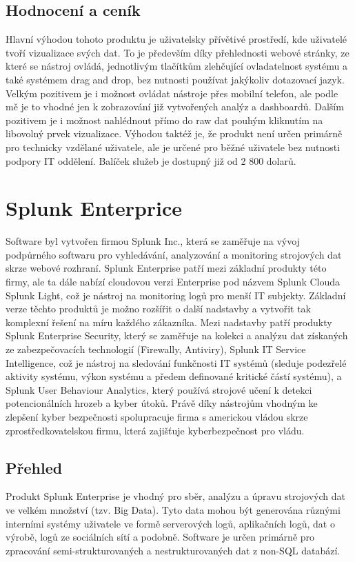 \documentclass[czech,BP]{thesiskiv2}
\begin{document}
\subsection{Hodnocení a ceník}
Hlavní výhodou tohoto produktu je uživatelsky přívětivé prostředí, kde uživatelé tvoří vizualizace svých dat. To je především díky přehlednosti webové stránky, ze které se nástroj ovládá, jednotlivým tlačítkům zlehčující ovladatelnost systému a také systémem drag and drop, bez nutnosti používat jakýkoliv dotazovací jazyk. Velkým pozitivem je i možnost ovládat nástroje přes mobilní telefon, ale podle mě je to vhodné jen k zobrazování již vytvořených analýz a dashboardů. Dalším pozitivem je i možnost nahlédnout přímo do raw dat pouhým kliknutím na libovolný prvek vizualizace. Výhodou taktéž je, že produkt není určen primárně pro technicky vzdělané uživatele, ale je určené pro běžné uživatele bez nutnosti podpory IT oddělení. Balíček služeb je dostupný již od 2 800 dolarů.\cite{InetCenik}



\section{Splunk Enterprice}
Software byl vytvořen firmou Splunk Inc., která se zaměřuje na vývoj podpůrného softwaru pro vyhledávání, analyzování a monitoring strojových dat skrze webové rozhraní.\cite{Splunk_a_kompatibilita} Splunk Enterprise patří mezi základní produkty této firmy, ale ta dále nabízí cloudovou verzi Enterprise pod názvem Splunk Cloud\texttrademark a Splunk Light, což je nástroj na monitoring logů pro menší IT subjekty. Základní verze těchto produktů je možno rozšířit o další nadstavby a vytvořit tak komplexní řešení na míru každého zákazníka. Mezi nadstavby patří produkty Splunk Enterprise Security, který se zaměřuje na kolekci a analýzu dat získaných ze zabezpečovacích technologií (Firewally, Antiviry), Splunk IT Service Intelligence, což je nástroj na sledování funkčnosti IT systémů (sleduje podezřelé aktivity systému, výkon systému a předem definované kritické částí systému), a Splunk User Behaviour Analytics, který používá strojové učení k detekci potencionálních hrozeb a kyber útoků. Právě díky nástrojům vhodným ke zlepšení kyber bezpečnosti spolupracuje firma s americkou vládou skrze zprostředkovatelskou firmu, která zajišťuje kyberbezpečnost pro vládu.\cite{Splunk_security}

\subsection{Přehled}
Produkt Splunk Enterprise je vhodný pro sběr, analýzu a úpravu strojových dat ve velkém množství (tzv. Big Data). Tyto data mohou být generována různými interními systémy uživatele ve formě serverových logů, aplikačních logů, dat o výrobě, logů ze sociálních sítí a podobně. Software je určen primárně pro zpracování semi-strukturovaných a nestrukturovaných dat z non-SQL databází.
\end{document}
